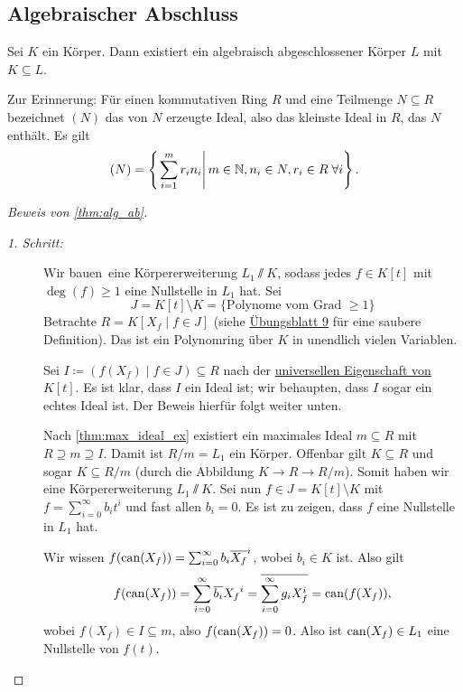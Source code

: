 \documentclass[12pt,a4paper]{scrartcl}
\begin{document}
\subsection{Algebraischer Abschluss}
\begin{satz}\label{thm:alg_ab}
	Sei $K$ ein Körper. Dann existiert ein algebraisch abgeschlossener Körper $L$ mit $K\subseteq L$.
\end{satz}

Zur Erinnerung: Für einen kommutativen Ring $R$ und eine Teilmenge $N\subseteq R$ bezeichnet $(N)$ das von $N$ erzeugte Ideal, also das kleinste Ideal in $R$, das $N$ enthält. Es gilt \[(N) = \left\{\left.\sum_{i = 1}^mr_in_i\right|m\in\mathbb N, n_i\in N, r_i\in R \;\forall i\right\}.\]

\begin{proof}[Beweis von \cref{thm:alg_ab}]
	\leavevmode
	\begin{description}
		\item[\emph{1. Schritt:}] Wir \glqq bauen\grqq\ eine Körpererweiterung $L_1\sslash K$, sodass jedes $f\in K[t]$ mit $\deg(f)\geq 1$ eine Nullstelle in $L_1$ hat. Sei 
		\[J = K[t]\setminus K = \{\text{Polynome vom Grad $\geq 1$}\}\]
		Betrachte $R = K[X_f\mid f\in J]$ (siehe \href{http://www.math.uni-bonn.de/people/palmer/EIDA-Blatt-09.pdf}{Übungsblatt 9} für eine saubere Definition).
		Das ist ein Polynomring über $K$ in unendlich vielen Variablen.
		
		Sei $I \coloneqq (f(X_f)\mid f\in J)\subseteq R$ nach der \hyperref[thm:unieig_polyring]{universellen Eigenschaft von $K[t]$}. Es ist klar, dass $I$ ein Ideal ist; wir behaupten, dass $I$ sogar ein echtes Ideal ist. Der Beweis hierfür folgt weiter unten.
		
		Nach \cref{thm:max_ideal_ex} existiert ein maximales Ideal $m\subseteq R$ mit $R\supseteq m \supseteq I$. Damit ist $R/m = L_1 $ ein Körper. Offenbar gilt $K \subseteq R$ und sogar $K \subseteq R/m$ (durch die Abbildung $K\to R\to R/m$). Somit haben wir eine Körpererweiterung $L_1\sslash K$. Sei nun $f\in J = K[t]\setminus K$ mit $f = \sum_{i = 0}^{\infty} b_i t^i$ und fast allen $b_i = 0$. Es ist zu zeigen, dass $f$ eine Nullstelle in $L_1$ hat.
		
		Wir wissen $f(\operatorname{can}(X_f)) = \sum_{i = 0}^{\infty}b_i\overline{X_f}^i$, wobei $b_i\in K$ ist. Also gilt \[f(\operatorname{can}(X_f)) = \sum_{i = 0}^{\infty}\overline{b_i}{X_f}^i = \overline{\sum_{i = 0}^{\infty}g_iX_f^i} = \operatorname{can}(f(X_f)),\] wobei $f(X_f)\in I\subseteq m$, also $f(\operatorname{can}(X_f)) = 0$. Also ist $\operatorname{can}(X_f)\in L_1$ eine Nullstelle von $f(t)$.
		

\end{description}
\end{proof}
\end{document}
